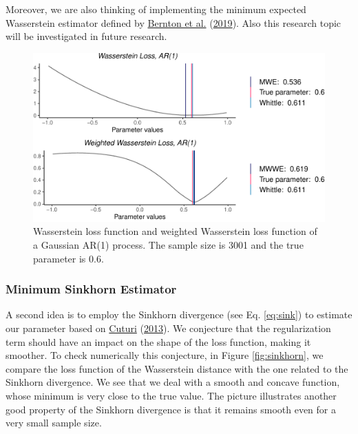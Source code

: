 \documentclass[
  11pt,
]{article}
\begin{document}
Moreover, we are also thinking of implementing the
minimum expected Wasserstein estimator defined by
\protect\hyperlink{ref-bernton2019parameter}{Bernton et al.}
(\protect\hyperlink{ref-bernton2019parameter}{2019}). Also this research
topic will be investigated in future research.

\begin{figure}

{\centering \includegraphics[width=0.55\linewidth]{Master_thesis_V3_files/figure-latex/wass_ar1_weighted-1} 

}

\caption{Wasserstein loss function and weighted Wasserstein loss function of a Gaussian AR(1) process. The sample size is 3001 and the true parameter is 0.6.}\label{fig:wass_ar1_weighted}
\end{figure}

\hypertarget{minimum-sinkhorn-estimator}{%
\subsubsection{Minimum Sinkhorn
Estimator}\label{minimum-sinkhorn-estimator}}

A second idea is to employ the Sinkhorn divergence (see Eq.
\ref{eq:sink}) to estimate our parameter based on
\protect\hyperlink{ref-cuturi2013sinkhorn}{Cuturi}
(\protect\hyperlink{ref-cuturi2013sinkhorn}{2013}). We conjecture that
the regularization term should have an impact on the shape of the loss
function, making it smoother. To check numerically this conjecture, in
Figure \ref{fig:sinkhorn}, we compare the loss function of the
Wasserstein distance with the one related to the Sinkhorn divergence. We
see that we deal with a smooth and concave function, whose minimum is
very close to the true value. The picture illustrates another good
property of the Sinkhorn divergence is that it remains smooth even for a
very small sample size.
\end{document}
